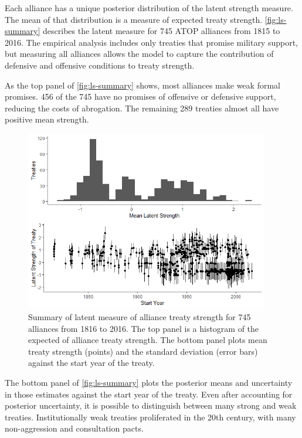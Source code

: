 \documentclass[12pt]{article}
\begin{document}
Each alliance has a unique posterior distribution of the latent strength measure. 
The mean of that distribution is a measure of expected treaty strength. 
\autoref{fig:ls-summary} describes the latent measure for 745 ATOP alliances from 1815 to 2016.
The empirical analysis includes only treaties that promise military support, but measuring all alliances allows the model to capture the contribution of defensive and offensive conditions to treaty strength. 


As the top panel of \autoref{fig:ls-summary} shows, most alliances make weak formal promises.
456 of the 745 have no promises of offensive or defensive support, reducing the costs of abrogation. 
The remaining 289 treaties almost all have positive mean strength. 


\begin{figure}
	\centering
		\includegraphics[width=0.95\textwidth]{../figures/ls-summary.png}
	\caption{Summary of latent measure of alliance treaty strength for 745 alliances from 1816 to 2016. The top panel is a histogram of the expected of alliance treaty strength. The bottom panel plots mean treaty strength (points) and the standard deviation (error bars) against the start year of the treaty.}
	\label{fig:ls-summary}
\end{figure}
	
	
The bottom panel of \autoref{fig:ls-summary} plots the posterior means and uncertainty in those estimates against the start year of the treaty. 
Even after accounting for posterior uncertainty, it is possible to distinguish between many strong and weak treaties. 
Institutionally weak treaties proliferated in the 20th century, with many non-aggression and consultation pacts. 
\end{document}

